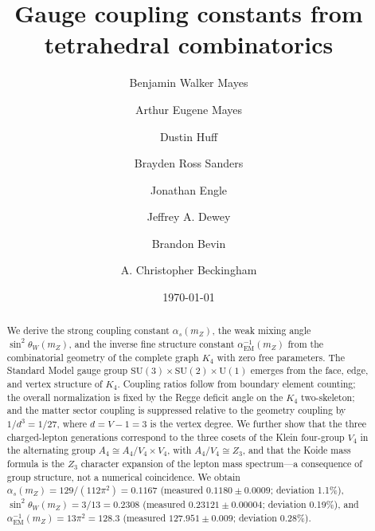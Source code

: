 \documentclass[aip,graphicx]{revtex4-1}
\begin{document}
\title{Gauge coupling constants from tetrahedral combinatorics}

\author{Benjamin Walker Mayes}

\author{Arthur Eugene Mayes}

\author{Dustin Huff}

\author{Brayden Ross Sanders}

\author{Jonathan Engle}

\author{Jeffrey A. Dewey}

\author{Brandon Bevin}

\author{A. Christopher Beckingham}

\date{\today}

\begin{abstract}
We derive the strong coupling constant $\alpha_s(m_Z)$, the weak
mixing angle $\sin^2\theta_W(m_Z)$, and the inverse fine structure
constant $\alpha_{\mathrm{EM}}^{-1}(m_Z)$ from the combinatorial
geometry of the complete graph $K_4$ with zero free parameters.
The Standard Model gauge group
$\mathrm{SU}(3)\times\mathrm{SU}(2)\times\mathrm{U}(1)$ emerges
from the face, edge, and vertex structure of $K_4$. Coupling ratios
follow from boundary element counting; the overall normalization is
fixed by the Regge deficit angle on the $K_4$ two-skeleton; and the
matter sector coupling is suppressed relative to the geometry coupling
by $1/d^3 = 1/27$, where $d = V-1 = 3$ is the vertex degree.
We further show that the three charged-lepton generations correspond
to the three cosets of the Klein four-group $V_4$ in the alternating
group $A_4 \cong A_4/V_4 \times V_4$, with $A_4/V_4 \cong Z_3$, and
that the Koide mass formula is the $Z_3$ character expansion of the
lepton mass spectrum---a consequence of group structure, not a
numerical coincidence.
We obtain $\alpha_s(m_Z) = 129/(112\pi^2) = 0.1167$ (measured
$0.1180 \pm 0.0009$; deviation 1.1\%),
$\sin^2\theta_W(m_Z) = 3/13 = 0.2308$ (measured $0.23121
\pm 0.00004$; deviation 0.19\%), and
$\alpha_{\mathrm{EM}}^{-1}(m_Z) = 13\pi^2 = 128.3$ (measured
$127.951 \pm 0.009$; deviation 0.28\%).
\end{abstract}

\end{document}
